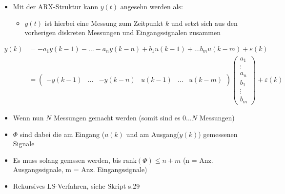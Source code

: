 \begin{itemize}
	\item Mit der ARX-Struktur kann $y(t)$ angesehn werden als:
	\begin{itemize}
		\item $y(t)$ ist hierbei eine Messung zum Zeitpunkt $k$ und setzt sich aus den vorherigen diskreten Messungen und Eingangssignalen zusammen
	\end{itemize}
\end{itemize}
\begin{align*}
	y(k) 	&= -a_1y(k-1)-\ldots -a_ny(k-n)+b_1u(k-1)+\ldots b_mu(k-m)+\varepsilon(k)\\
			&= \begin{pmatrix}
				-y(k-1) &\ldots &-y(k-n) & u(k-1) & \ldots & u(k-m)
			\end{pmatrix}
			\begin{pmatrix}
				a_1\\ 
				\vdots \\
				a_n\\
				b_1\\
				\vdots\\
				b_m
			\end{pmatrix}+\varepsilon(k)
\end{align*}
\begin{itemize}
	\item Wenn nun $N$ Messungen gemacht werden (somit sind es $0\ldots N$ Messungen)
	\item $\Phi$ sind dabei die am Eingang ($u(k)$ und am Ausgang($y(k)$) gemessenen Signale
	\item Es muss solang gemssen werden, bis $\text{rank}(\Phi) \leq n+m$ (n = Anz. Ausgangssignale, m = Anz. Eingangssignale)
	\item Rekursives LS-Verfahren, siehe Skript s.29
\end{itemize}
